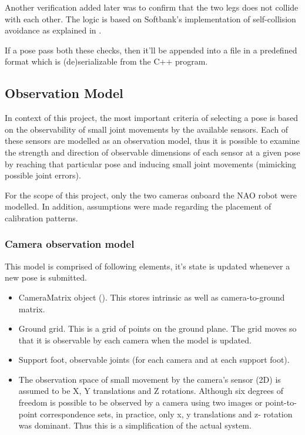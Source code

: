 \documentclass[english, printversion, nomenclature, notitle]{tuvisionthesis} %
\begin{document}
Another verification added later was to confirm that the two legs does not collide with each other. The logic is based on Softbank's implementation of self-collision avoidance as explained in .

If a pose pass both these checks, then it'll be appended into a file in a predefined format which is (de)serializable from the C++ program. 

\subsection{Observation Model}
In context of this project, the most important criteria of selecting a pose is based on the observability of small joint movements by the available sensors. Each of these sensors are modelled as an observation model, thus it is possible to examine the strength and direction of observable dimensions of each sensor at a given pose by reaching that particular pose and inducing small joint movements (mimicking possible joint errors).

For the scope of this project, only the two cameras onboard the NAO robot were modelled. In addition, assumptions were made regarding the placement of calibration patterns.

\subsubsection{Camera observation model}

This model is comprised of following elements, it's state is updated whenever a new pose is submitted.
\begin{itemize}
	\item CameraMatrix object ().
	\subitem This stores intrinsic as well as camera-to-ground matrix.
	\item Ground grid. This is a grid of points on the ground plane.
	\subitem The grid moves so that it is observable by each camera when the model is updated.
	\item Support foot, observable joints (for each camera and at each support foot). 
	\item The observation space of small movement by the camera's sensor (2D) is assumed to be X, Y translations and Z rotations.
	\subitem Although six degrees of freedom is possible to be observed by a camera using two images or point-to-point correspondence sets, in practice, only x, y translations and z- rotation was dominant.  Thus this is a simplification of the actual system.
\end{itemize}
\end{document}
